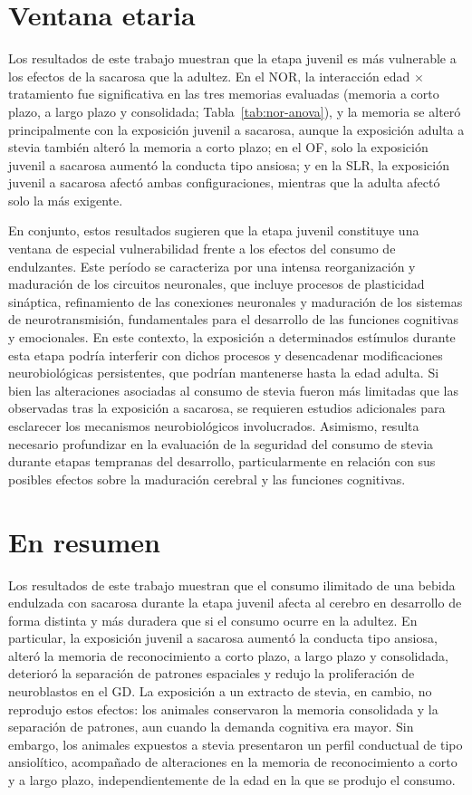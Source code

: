 \section{Ventana etaria}\label{sec:disc-edad}

Los resultados de este trabajo muestran que la etapa juvenil es más vulnerable a los efectos de la sacarosa que la adultez. En el NOR, la interacción edad $\times$ tratamiento fue significativa en las tres memorias evaluadas (memoria a corto plazo, a largo plazo y consolidada; Tabla~\ref{tab:nor-anova}), y la memoria se alteró principalmente con la exposición juvenil a sacarosa, aunque la exposición adulta a stevia también alteró la memoria a corto plazo; en el OF, solo la exposición juvenil a sacarosa aumentó la conducta tipo ansiosa; y en la SLR, la exposición juvenil a sacarosa afectó ambas configuraciones, mientras que la adulta afectó solo la más exigente.

En conjunto, estos resultados sugieren que la etapa juvenil constituye una ventana de especial vulnerabilidad frente a los efectos del consumo de endulzantes. Este período se caracteriza por una intensa reorganización y maduración de los circuitos neuronales, que incluye procesos de plasticidad sináptica, refinamiento de las conexiones neuronales y maduración de los sistemas de neurotransmisión, fundamentales para el desarrollo de las funciones cognitivas y emocionales. En este contexto, la exposición a determinados estímulos durante esta etapa podría interferir con dichos procesos y desencadenar modificaciones neurobiológicas persistentes, que podrían mantenerse hasta la edad adulta. Si bien las alteraciones asociadas al consumo de stevia fueron más limitadas que las observadas tras la exposición a sacarosa, se requieren estudios adicionales para esclarecer los mecanismos neurobiológicos involucrados. Asimismo, resulta necesario profundizar en la evaluación de la seguridad del consumo de stevia durante etapas tempranas del desarrollo, particularmente en relación con sus posibles efectos sobre la maduración cerebral y las funciones cognitivas.

\section{En resumen}\label{sec:disc-integracion}

Los resultados de este trabajo muestran que el consumo ilimitado de una bebida endulzada con sacarosa durante la etapa juvenil afecta al cerebro en desarrollo de forma distinta y más duradera que si el consumo ocurre en la adultez. En particular, la exposición juvenil a sacarosa aumentó la conducta tipo ansiosa, alteró la memoria de reconocimiento a corto plazo, a largo plazo y consolidada, deterioró la separación de patrones espaciales y redujo la proliferación de neuroblastos en el GD. La exposición a un extracto de stevia, en cambio, no reprodujo estos efectos: los animales conservaron la memoria consolidada y la separación de patrones, aun cuando la demanda cognitiva era mayor. Sin embargo, los animales expuestos a stevia presentaron un perfil conductual de tipo ansiolítico, acompañado de alteraciones en la memoria de reconocimiento a corto y a largo plazo, independientemente de la edad en la que se produjo el consumo.

